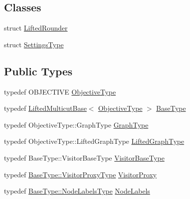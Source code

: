 \subsection*{Classes}
\begin{DoxyCompactItemize}
\item 
struct \hyperlink{structnifty_1_1graph_1_1opt_1_1lifted__multicut_1_1LiftedMulticutMp_1_1LiftedRounder}{Lifted\+Rounder}
\item 
struct \hyperlink{structnifty_1_1graph_1_1opt_1_1lifted__multicut_1_1LiftedMulticutMp_1_1SettingsType}{Settings\+Type}
\end{DoxyCompactItemize}
\subsection*{Public Types}
\begin{DoxyCompactItemize}
\item 
typedef O\+B\+J\+E\+C\+T\+I\+VE \hyperlink{classnifty_1_1graph_1_1opt_1_1lifted__multicut_1_1LiftedMulticutMp_a7946ba353b86ff043eff57fd75513b81}{Objective\+Type}
\item 
typedef \hyperlink{classnifty_1_1graph_1_1opt_1_1lifted__multicut_1_1LiftedMulticutBase}{Lifted\+Multicut\+Base}$<$ \hyperlink{classnifty_1_1graph_1_1opt_1_1lifted__multicut_1_1LiftedMulticutMp_a7946ba353b86ff043eff57fd75513b81}{Objective\+Type} $>$ \hyperlink{classnifty_1_1graph_1_1opt_1_1lifted__multicut_1_1LiftedMulticutMp_a7e49c98a298643cc17c1732827b64243}{Base\+Type}
\item 
typedef Objective\+Type\+::\+Graph\+Type \hyperlink{classnifty_1_1graph_1_1opt_1_1lifted__multicut_1_1LiftedMulticutMp_a5bcaa1eb387ff68922510b6f2e450f7f}{Graph\+Type}
\item 
typedef Objective\+Type\+::\+Lifted\+Graph\+Type \hyperlink{classnifty_1_1graph_1_1opt_1_1lifted__multicut_1_1LiftedMulticutMp_a1d5aafa1c0d8788834f959edd40f17e7}{Lifted\+Graph\+Type}
\item 
typedef Base\+Type\+::\+Visitor\+Base\+Type \hyperlink{classnifty_1_1graph_1_1opt_1_1lifted__multicut_1_1LiftedMulticutMp_a8169f3c3105c3179ae7a2881502826bd}{Visitor\+Base\+Type}
\item 
typedef \hyperlink{classnifty_1_1graph_1_1opt_1_1common_1_1SolverBase_ad209b469b3bc9fc0fc14e9fed4d09075}{Base\+Type\+::\+Visitor\+Proxy\+Type} \hyperlink{classnifty_1_1graph_1_1opt_1_1lifted__multicut_1_1LiftedMulticutMp_adcaaef01d0a495768cb27f4b6f20c8e1}{Visitor\+Proxy}
\item 
typedef \hyperlink{classnifty_1_1graph_1_1opt_1_1common_1_1SolverBase_abefd51561de2fd009f6bed6bef6009ea}{Base\+Type\+::\+Node\+Labels\+Type} \hyperlink{classnifty_1_1graph_1_1opt_1_1lifted__multicut_1_1LiftedMulticutMp_a98651524f908efa229d69761f4fa5491}{Node\+Labels}

\end{DoxyCompactItemize}

